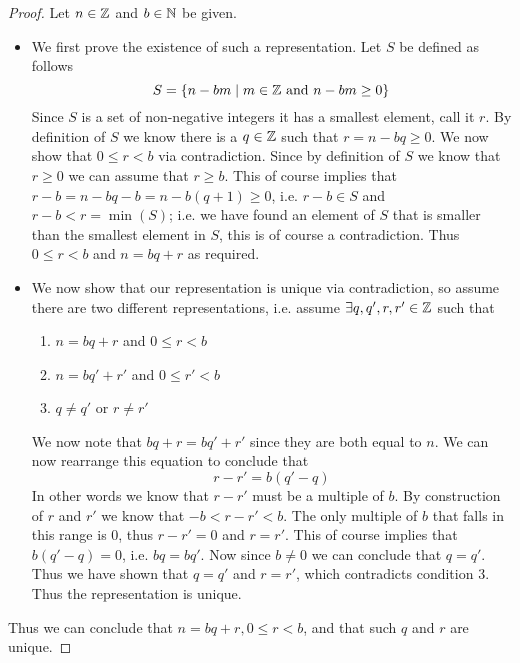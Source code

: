         \begin{proof}
            Let $n \in \mathbb{Z}$ and $b \in \mathbb{N}$ be given.
            \begin{itemize}
                \item
                    We first prove the existence of such a representation.
                    Let $S$ be defined as follows
                    \[
                        S = \left\{n - bm \mid m \in \mathbb{Z} \mbox{ and } n - bm \ge 0\right\}
                    \]
                    Since $S$ is a set of non-negative integers it has a smallest element,
                    call it $r$. By definition of $S$ we know there is a $q \in \mathbb{Z}$
                    such that $r = n - bq \ge 0$. We now show that $0 \le r < b$ via contradiction.
                    Since by definition of $S$ we know that $r \ge 0$ we can assume that
                    $r \ge b$. This of course implies that $r - b = n - bq - b = n - b(q + 1) \ge 0$,
                    i.e. $r - b \in S$ and $r - b < r = \min(S)$; i.e. we have found an element
                    of $S$ that is smaller than the smallest element in $S$, this is 
                    of course a contradiction. Thus $0 \le r < b$ and $n = bq + r$ as required.
                \item
                    We now show that our representation is unique via contradiction, so 
                    assume there are two different representations, i.e. assume $\exists
                    q, q', r, r' \in \mathbb{Z}$ such that
                    \begin{enumerate}
                        \item
                            $n = bq + r$ and $0 \le r < b$
                        \item
                            $n = bq' + r'$ and $0 \le r' < b$
                        \item
                            $q \neq q'$ or $r \neq r'$
                    \end{enumerate}
                    We now note that $bq + r = bq' + r'$ since they are both equal to $n$. We
                    can now rearrange this equation to conclude that
                    \[
                        r - r' = b(q' - q)
                    \]
                    In other words we know that $r - r'$ must be a multiple of $b$. By construction
                    of $r$ and $r'$ we know that $-b < r - r' < b$. The only multiple of $b$ that falls in
                    this range is 0, thus $r - r' = 0$ and $r = r'$. This of course implies
                    that $b(q' - q) = 0$, i.e. $bq = bq'$. Now since $b \neq 0$ we can conclude that $q = q'$.
                    Thus we have shown that $q = q'$ and $r = r'$, which contradicts condition 3.
                    Thus the representation is unique.
            \end{itemize}
            Thus we can conclude that $n = bq + r, 0 \le r < b$, and 
            that such $q$ and $r$ are unique. \QED
        \end{proof}
